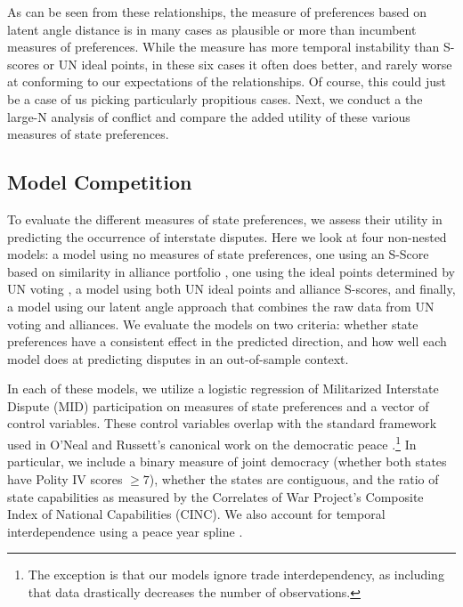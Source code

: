 
As can be seen from these relationships, the measure of preferences based on latent angle distance is in many cases as plausible or more than incumbent measures of preferences. While the measure has more temporal instability than S-scores or UN ideal points, in these six cases it often does better, and rarely worse at conforming to our expectations of the relationships. Of course, this could just be a case of us picking particularly propitious cases. Next, we conduct a the large-N analysis of conflict and compare the added utility of these various measures of state preferences.

\subsection*{Model Competition}

To evaluate the different measures of state preferences, we assess their utility in predicting the occurrence of interstate disputes. Here we look at four non-nested models: a model using no measures of state preferences, one using an S-Score based on similarity in alliance portfolio \citep{signorino:ritter:1999}, one using the ideal points determined by UN voting \citep{bailey:etal:2015}, a model using both UN ideal points and alliance S-scores, and finally, a model using our latent angle approach that combines the raw data from UN voting and alliances. We evaluate the models on two criteria: whether state preferences have a consistent effect in the predicted direction, and how well each model does at predicting disputes in an out-of-sample context.

In each of these models, we utilize a logistic regression of Militarized Interstate Dispute (MID) participation on measures of state preferences and a vector of control variables. These control variables overlap with the standard framework used in O'Neal and Russett's canonical work on the democratic peace \citep{oneal:russett:1997}.\footnote{The exception is that our models ignore trade interdependency, as including that data drastically decreases the number of observations.} In particular, we include a binary measure of joint democracy (whether both states have Polity IV scores $\geq 7$), whether the states are contiguous, and the ratio of state capabilities as measured by the Correlates of War Project's Composite Index of National Capabilities (CINC). We also account for temporal interdependence using a peace year spline \citep{carter:signorino:2010}. 

